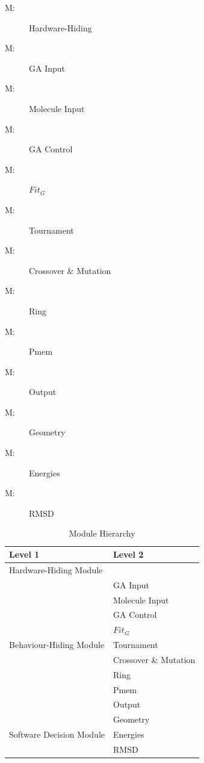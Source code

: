 \documentclass[12pt, titlepage]{article}
\newcounter{mnum}
\newcommand{\mthemnum}{M\themnum}
\begin{document}
\begin{description}
\item [ \mthemnum \label{mHH}:] Hardware-Hiding
\item [ \mthemnum \label{mGAIn}:] GA Input
\item [ \mthemnum \label{mMolIn}:] Molecule Input
\item [ \mthemnum \label{mGAC}:] GA Control
\item [ \mthemnum \label{mFitg}:] $Fit_G$
\item [ \mthemnum \label{mTour}:] Tournament
\item [ \mthemnum \label{mCM}:] Crossover \& Mutation
\item [ \mthemnum \label{mRing}:] Ring
\item [ \mthemnum \label{mPmem}:] Pmem
\item [ \mthemnum \label{mOut}:] Output
\item [ \mthemnum \label{mGeometry}:] Geometry
\item [ \mthemnum \label{mE}:] Energies
\item [ \mthemnum \label{mRMSD}:] RMSD
\end{description}


\begin{table}[h!]
\centering
\begin{tabular}{p{} p{}}
\toprule
\textbf{Level 1} & \textbf{Level 2}\\
\midrule

{Hardware-Hiding Module} & ~ \\
\midrule

\multirow{9}{0.3\textwidth}{Behaviour-Hiding Module}& GA Input \\
													& Molecule Input \\
													& GA Control\\
													& $Fit_G$ \\
													& Tournament \\
													& Crossover \& Mutation \\
													& Ring \\
													& Pmem \\
													& Output \\

\midrule

\multirow{3}{0.3\textwidth}{Software Decision Module} & Geometry \\
													  & Energies \\
													  & RMSD \\
\bottomrule

\end{tabular}
\caption{Module Hierarchy}
\label{TblMH}
\end{table}
\end{document}
